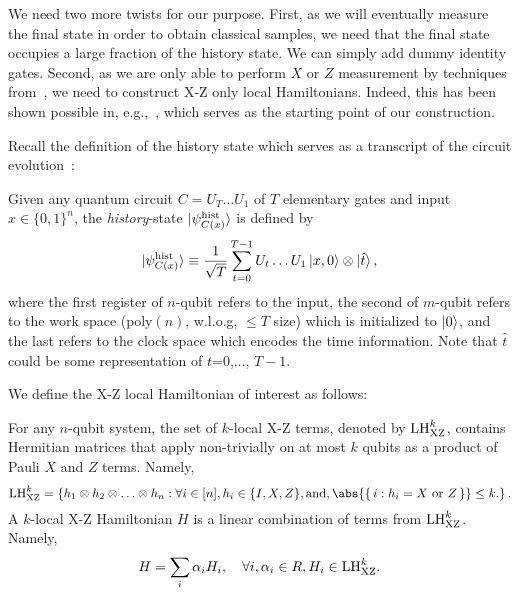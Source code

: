 We need two more twists for our purpose.
First, as we will eventually measure the final state in order to obtain classical samples, we need that the final state occupies a large fraction of the history state. We can simply add dummy identity gates.
Second, as we are only able to perform $X$ or $Z$ measurement by techniques from~\cite{FOCS:Mahadev18a},
we need to construct X-Z only local Hamiltonians.
Indeed, this has been shown possible in, e.g.,~\cite{PhysRevA.78.012352}, which serves as the starting point of our construction.

Recall the definition of the history state which serves as a transcript of the circuit evolution~\cite{kitaev2002classical}:

\begin{dfn}
    \label{dfn:groundstate}    
    Given any quantum circuit $C=U_T\ldots U_1$ of $T$ elementary gates and input $x\in\{0,1\}^n$, the \emph{history}-state $\ket{\psi_{C(x)}^{\mathrm{hist}}}$ is defined by
    \begin{equation}
        \ket{\psi_{C(x)}^{\mathrm{hist}}} \equiv \frac{1}{\sqrt{T}}\sum_{t=0}^{T-1}U_t\ldots U_1\ket{x,0}\otimes\ket{\hat{t}},
    \end{equation}
    where the first register of $n$-qubit refers to the input, the second of $m$-qubit refers to the work space ($\mathrm{poly}(n)$, w.l.o.g, $\leq T$ size) which is initialized to $\ket{0}$, and the last refers to the clock space which encodes the time information. Note that $\hat{t}$ could be some representation of $t$=0,..., $T-1$.
\end{dfn}

We define the X-Z local Hamiltonian of interest as follows:

\begin{dfn} For any $n$-qubit system, the set of $k$-local X-Z terms, denoted by $\mathrm{LH}_{\mathrm{XZ}}^{k}$, contains Hermitian matrices that apply non-trivially on at most $k$ qubits as a product of Pauli $X$ and $Z$ terms. Namely,
\begin{equation}
  \LHXZ{k} = \left\{h_1 \otimes h_2 \otimes \ldots \otimes h_n: \forall i \in [n], h_i \in \{I, X, Z\}, \text{and}, \abs{\set{i: h_i=X \text{ or }Z}} \leq k. \right \}.
\end{equation}
A $k$-local X-Z Hamiltonian $H$ is a linear combination of terms from $\mathrm{LH}_{\mathrm{XZ}}^{k}$. Namely,
\begin{equation}
  H = \sum_i \alpha_{i} H_i,  \quad \forall i, \alpha_i \in R,  H_i \in \mathrm{LH}_{\mathrm{XZ}}^{k}.
\end{equation}
\end{dfn}

